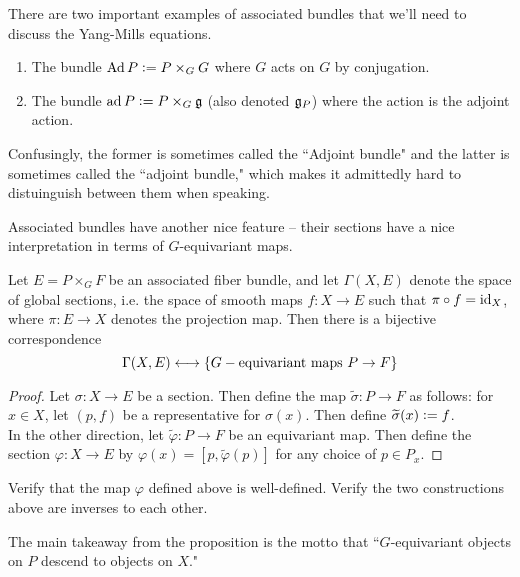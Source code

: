 %
\begin{exmp}
There are two important examples of associated bundles that we'll need to discuss
the Yang-Mills equations.
\begin{enumerate}
  \item The bundle $\operatorname{Ad} P \vcentcolon= P \times_G G$ where $G$ acts on $G$ by conjugation.
  \item The bundle $\operatorname{ad} P \vcentcolon= P \times_G \mathfrak{g}$ (also denoted $\mathfrak{g}_P$) where
  the action is the adjoint action.
\end{enumerate}
Confusingly, the former is sometimes called the ``Adjoint bundle" and the
latter is sometimes called the ``adjoint bundle," which makes it admittedly
hard to distuinguish between them when speaking.
\end{exmp}
%
Associated bundles have another nice feature -- their sections have
a nice interpretation in terms of $G$-equivariant maps.
%
\begin{prop}
Let $E = P \times_G F$ be an associated fiber bundle, and let
$\Gamma(X,E)$ denote the space of global sections, i.e. the space of
smooth maps $f : X \to E$ such that $\pi \circ f = \operatorname{id}_X$, where
$\pi : E \to X$ denotes the projection map. Then there is a bijective correspondence
\[
\Gamma(X,E) \longleftrightarrow \left\lbrace G-\text{equivariant maps } P \to F \right\rbrace
\]
\end{prop}
%
\begin{proof}
Let $\sigma : X \to E$ be a section. Then define the map
$\widetilde{\sigma} : P \to F$ as follows: for $x \in X$, let $(p,f)$ be a
representative for $\sigma(x)$. Then define $\widetilde{\sigma}(x) \vcentcolon= f$. \\

In the other direction, let $\widetilde{\varphi} : P \to F$ be an equivariant
map. Then define the section $\varphi : X \to E$ by
$\varphi(x) = [p,\widetilde{\varphi}(p)]$ for any choice of $p \in P_x$.
\end{proof}
%
\begin{exer}
Verify that the map $\varphi$ defined above is well-defined. Verify the two
constructions above are inverses to each other.
\end{exer}
%
The main takeaway from the proposition is the motto that ``$G$-equivariant
objects on $P$ descend to objects on $X$." \\

